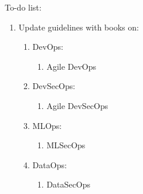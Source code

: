 \documentclass[letter,12pt]{article}
\begin{document}
To-do list: \vspace{-0.3cm}
\begin{enumerate} \itemsep -4pt
\item Update guidelines with books on: \vspace{-0.3cm}
	\begin{enumerate} \itemsep -2pt
	\item DevOps: \vspace{-0.2cm}
		\begin{enumerate} \itemsep -2pt
		\item Agile DevOps
		\end{enumerate}
	\item DevSecOps: \vspace{-0.2cm}
		\begin{enumerate} \itemsep -2pt
		\item Agile DevSecOps
		\end{enumerate}
	\item MLOps: \vspace{-0.2cm}
		\begin{enumerate} \itemsep -2pt
		\item MLSecOps
		\end{enumerate}
	\item DataOps: \vspace{-0.2cm}
		\begin{enumerate} \itemsep -2pt
		\item DataSecOps
		\end{enumerate}
	\end{enumerate}
\end{enumerate}














%
%
%

{\linespread{1}

%
%

}
%
\end{document}
